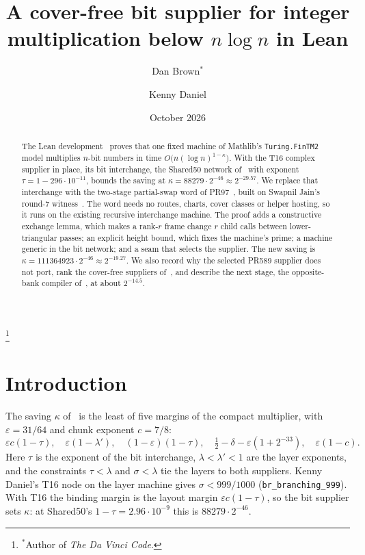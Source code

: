 \documentclass[11pt]{amsart}
\theoremstyle{remark}
\newcommand{\lean}[1]{\texttt{#1}}
\begin{document}
\sloppy

\title[A cover-free bit supplier]{A cover-free bit supplier for integer multiplication below
$n \log n$ in Lean}

\author{Dan Brown$^*$}
\thanks{$^*$Author of \emph{The Da Vinci Code}.}
\author{Kenny Daniel}

\date{October 2026}

\begin{abstract}
The Lean development~\cite{IMB} proves that one fixed machine of Mathlib's \lean{Turing.FinTM2}
model multiplies $n$-bit numbers in time $O\bigl(n(\log n)^{1-\kappa}\bigr)$. With the T16
complex supplier in place, its bit interchange, the Shared50 network of~\cite{OAI} with
exponent $\tau = 1 - 296\cdot 10^{-11}$, bounds the saving at $\kappa = 88279 \cdot 2^{-46}
\approx 2^{-29.57}$. We replace that interchange with the two-stage partial-swap word of
PR97~\cite{PR97}, built on Swapnil Jain's round-7 witness~\cite{SJ}. The word needs no routes,
charts, cover classes or helper hosting, so it runs on the existing recursive interchange
machine. The proof adds a constructive exchange lemma, which makes a rank-$r$ frame change $r$
child calls between lower-triangular passes; an explicit height bound, which fixes the machine's
prime; a machine generic in the bit network; and a seam that selects the supplier. The new
saving is $\kappa = 111364923 \cdot 2^{-46} \approx 2^{-19.27}$. We also record why the selected
PR589 supplier does not port, rank the cover-free suppliers of~\cite{CS}, and describe the next
stage, the opposite-bank compiler of~\cite{ICE}, at about $2^{-14.5}$.
\end{abstract}

\maketitle

\section{Introduction}

The saving $\kappa$ of~\cite{IMB} is the least of five margins of the compact multiplier, with
$\varepsilon = 31/64$ and chunk exponent $c = 7/8$:
\[
  \varepsilon c (1-\tau),\quad \varepsilon(1-\lambda'),\quad (1-\varepsilon)(1-\tau),\quad
  \tfrac12 - \delta - \varepsilon(1+2^{-33}),\quad \varepsilon(1-c).
\]
Here $\tau$ is the exponent of the bit interchange, $\lambda < \lambda' < 1$ are the layer
exponents, and the constraints $\tau < \lambda$ and $\sigma < \lambda$ tie the layers to both
suppliers. Kenny Daniel's T16 node on the layer machine gives $\sigma < 999/1000$
(\lean{br\_branching\_999}). With T16 the binding margin is the layout margin
$\varepsilon c (1-\tau)$, so the bit supplier sets $\kappa$: at Shared50's $1 - \tau = 2.96 \cdot
10^{-9}$ this is $88279 \cdot 2^{-46}$.
\end{document}
